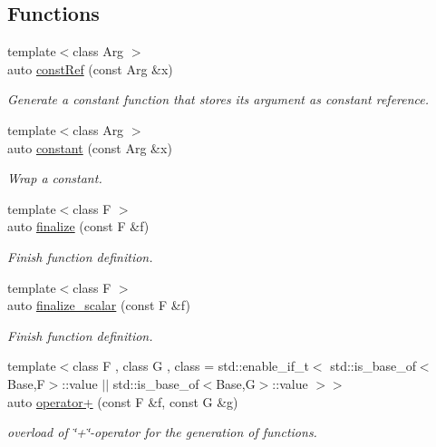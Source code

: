\subsection*{Functions}
\begin{DoxyCompactItemize}
\item 
{\footnotesize template$<$class Arg $>$ }\\auto \hyperlink{namespaceRFFGen_a1e5703444079774f6e6a9161a9bacc6b}{const\-Ref} (const Arg \&x)
\begin{DoxyCompactList}\small\item\em Generate a constant function that stores its argument as constant reference. \end{DoxyCompactList}\item 
{\footnotesize template$<$class Arg $>$ }\\auto \hyperlink{namespaceRFFGen_a181c95df45572198e3e6bcac7616cd68}{constant} (const Arg \&x)
\begin{DoxyCompactList}\small\item\em Wrap a constant. \end{DoxyCompactList}\item 
{\footnotesize template$<$class F $>$ }\\auto \hyperlink{namespaceRFFGen_ad0d4bfae5fedad4740c0ab09cb4ff0a1}{finalize} (const F \&f)
\begin{DoxyCompactList}\small\item\em Finish function definition. \end{DoxyCompactList}\item 
{\footnotesize template$<$class F $>$ }\\auto \hyperlink{namespaceRFFGen_a8a6f6d638cd22c164c671c239486bb88}{finalize\-\_\-scalar} (const F \&f)
\begin{DoxyCompactList}\small\item\em Finish function definition. \end{DoxyCompactList}\item 
{\footnotesize template$<$class F , class G , class  = std\-::enable\-\_\-if\-\_\-t$<$ std\-::is\-\_\-base\-\_\-of$<$\-Base,\-F$>$\-::value $\vert$$\vert$                                      std\-::is\-\_\-base\-\_\-of$<$\-Base,\-G$>$\-::value $>$$>$ }\\auto \hyperlink{namespaceRFFGen_a45fcf65f6c783e3da0a0007291f706ca}{operator+} (const F \&f, const G \&g)
\begin{DoxyCompactList}\small\item\em overload of \char`\"{}+\char`\"{}-\/operator for the generation of functions. \end{DoxyCompactList}\item 

\end{DoxyCompactItemize}
